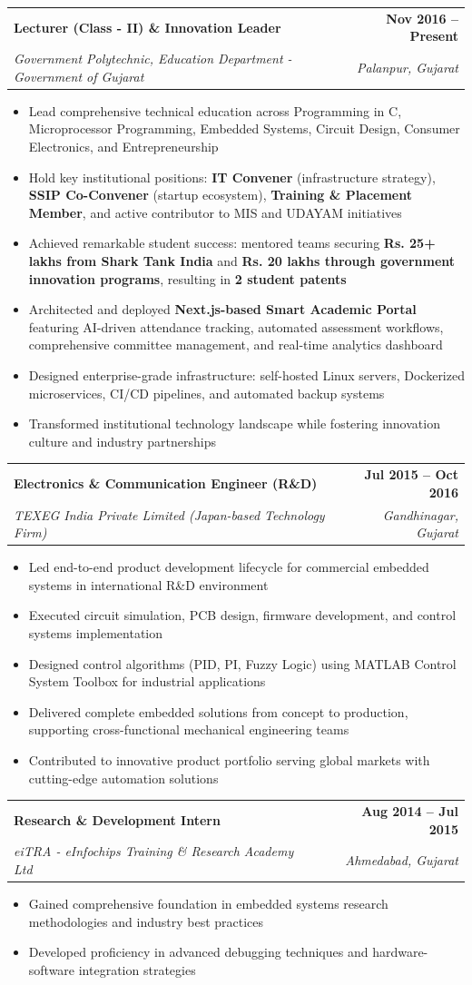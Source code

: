 \documentclass[11pt,a4paper]{article}
\makeatletter
\newcommand{\resumeItem}[1]{
    \item\small{#1 \vspace{-1pt}}
}
\newcommand{\resumeSubheading}[4]{
    \vspace{-1pt}\item
    \begin{tabular*}{0.97\textwidth}[t]{l@{\extracolsep{\fill}}r}
        \textbf{\color{secondary}#1} & \textbf{\color{mediumgray}\small #2} \\
        \textit{\small\color{primary}#3} & \textit{\small\color{mediumgray} #4} \\
    \end{tabular*}\vspace{-3pt}
}
\newcommand{\resumeItemListStart}{\begin{itemize}[leftmargin=0.3in]}
\newcommand{\resumeItemListEnd}{\end{itemize}\vspace{-4pt}}
\makeatother
\begin{document}
\resumeSubheading
{Lecturer (Class - II) \& Innovation Leader}{Nov 2016 -- Present}
{Government Polytechnic, Education Department - Government of Gujarat}{Palanpur, Gujarat}
\resumeItemListStart
\resumeItem{Lead comprehensive technical education across Programming in C, Microprocessor Programming, Embedded Systems, Circuit Design, Consumer Electronics, and Entrepreneurship}
\resumeItem{Hold key institutional positions: \textbf{IT Convener} (infrastructure strategy), \textbf{SSIP Co-Convener} (startup ecosystem), \textbf{Training \& Placement Member}, and active contributor to MIS and UDAYAM initiatives}
\resumeItem{Achieved remarkable student success: mentored teams securing \textbf{Rs. 25+ lakhs from Shark Tank India} and \textbf{Rs. 20 lakhs through government innovation programs}, resulting in \textbf{2 student patents}}
\resumeItem{Architected and deployed \textbf{Next.js-based Smart Academic Portal} featuring AI-driven attendance tracking, automated assessment workflows, comprehensive committee management, and real-time analytics dashboard}
\resumeItem{Designed enterprise-grade infrastructure: self-hosted Linux servers, Dockerized microservices, CI/CD pipelines, and automated backup systems}
\resumeItem{Transformed institutional technology landscape while fostering innovation culture and industry partnerships}
\resumeItemListEnd

\resumeSubheading
{Electronics \& Communication Engineer (R\&D)}{Jul 2015 -- Oct 2016}
{TEXEG India Private Limited (Japan-based Technology Firm)}{Gandhinagar, Gujarat}
\resumeItemListStart
\resumeItem{Led end-to-end product development lifecycle for commercial embedded systems in international R\&D environment}
\resumeItem{Executed circuit simulation, PCB design, firmware development, and control systems implementation}
\resumeItem{Designed control algorithms (PID, PI, Fuzzy Logic) using MATLAB Control System Toolbox for industrial applications}
\resumeItem{Delivered complete embedded solutions from concept to production, supporting cross-functional mechanical engineering teams}
\resumeItem{Contributed to innovative product portfolio serving global markets with cutting-edge automation solutions}
\resumeItemListEnd

\resumeSubheading
{Research \& Development Intern}{Aug 2014 -- Jul 2015}
{eiTRA - eInfochips Training \& Research Academy Ltd}{Ahmedabad, Gujarat}
\resumeItemListStart
\resumeItem{Gained comprehensive foundation in embedded systems research methodologies and industry best practices}
\resumeItem{Developed proficiency in advanced debugging techniques and hardware-software integration strategies}
\resumeItemListEnd
\end{document}
